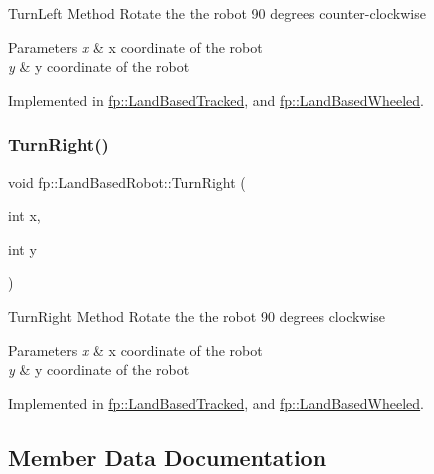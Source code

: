 Turn\+Left Method Rotate the the robot 90 degrees counter-\/clockwise 
\begin{DoxyParams}{Parameters}
{\em x} & x coordinate of the robot \\
\hline
{\em y} & y coordinate of the robot \\
\hline
\end{DoxyParams}


Implemented in \hyperlink{classfp_1_1_land_based_tracked_a2b106dbbb108cb97f212ed661e8d244b}{fp\+::\+Land\+Based\+Tracked}, and \hyperlink{classfp_1_1_land_based_wheeled_ad7e32884e0747b347d5d74db171c2854}{fp\+::\+Land\+Based\+Wheeled}.

\mbox{\label{classfp_1_1_land_based_robot_a7360e4084bc5254f72ab0d3612644907}} 
\subsubsection{\texorpdfstring{Turn\+Right()}{TurnRight()}}
{\footnotesize\ttfamily void fp\+::\+Land\+Based\+Robot\+::\+Turn\+Right (\begin{DoxyParamCaption}\item[{int}]{x,  }\item[{int}]{y }\end{DoxyParamCaption})\hspace{0.3cm}{\ttfamily [pure virtual]}}

Turn\+Right Method Rotate the the robot 90 degrees clockwise 
\begin{DoxyParams}{Parameters}
{\em x} & x coordinate of the robot \\
\hline
{\em y} & y coordinate of the robot \\
\hline
\end{DoxyParams}


Implemented in \hyperlink{classfp_1_1_land_based_tracked_a00cc1731e59096f3fe490f108ebc7012}{fp\+::\+Land\+Based\+Tracked}, and \hyperlink{classfp_1_1_land_based_wheeled_a759f28e9ca00e77cc0e2f2ce2f524811}{fp\+::\+Land\+Based\+Wheeled}.



\subsection{Member Data Documentation}
\mbox{\label{classfp_1_1_land_based_robot_af906410bad105b30865b9a02fdd350f9}} 
